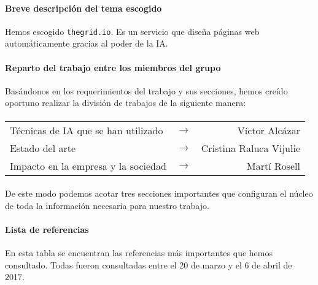 \paragraph{Breve descripción del tema escogido}

Hemos escogido \texttt{thegrid.io}. Es un servicio que diseña páginas web
automáticamente gracias al poder de la IA.

\paragraph{Reparto del trabajo entre los miembros del grupo}

Basándonos en los requerimientos del trabajo y sus secciones, hemos creído
oportuno realizar la división de trabajos de la siguiente manera:

\paragraph{}

\begin{tabular}{ l c r }
  Técnicas de IA que se han utilizado & $\longrightarrow$ & Víctor Alcázar \\ 
  Estado del arte & $\longrightarrow$ & Cristina Raluca Vijulie \\
  Impacto en la empresa y la sociedad & $\longrightarrow$ & Martí Rosell \\
\end{tabular}

\paragraph{}

De este modo podemos acotar tres secciones importantes que configuran
el núcleo de toda la información necesaria para nuestro trabajo.

\paragraph{Lista de referencias} 

En esta tabla se encuentran las referencias más importantes que hemos 
consultado. Todas fueron consultadas entre el 20 de marzo y el 6 de abril de 2017.

\paragraph{}

